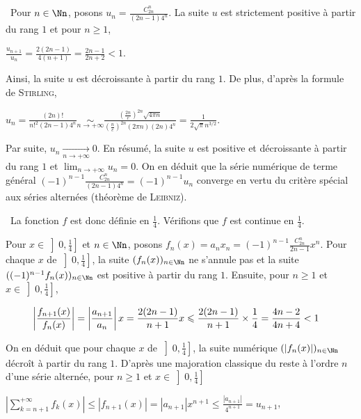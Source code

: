 {{\textbullet~Pour $n\in\Nn$, posons $u_n= \frac{C_{2n}^n}{(2n-1)4^n}$. La suite $u$ est strictement positive à partir du rang $1$ et pour $n\geqslant1$, 

\begin{center}
$ \frac{u_{n+1}}{u_n}= \frac{2(2n-1)}{4(n+1)}= \frac{2n-1}{2n+2}<1$.
\end{center}

Ainsi, la suite $u$ est décroissante à partir du rang $1$. De plus, d'après la formule de \textsc{Stirling},

\begin{center}
$u_n= \frac{(2n)!}{n!^2(2n-1)4^n}\underset{n\rightarrow+\infty}{\sim} \frac{\left( \frac{2n}{e}\right)^{2n}\sqrt{4\pi n}}{\left( \frac{n}{e}\right)^{2n}(2\pi n)(2n)4^n}= \frac{1}{2\sqrt{\pi}n^{3/2}}$.
\end{center}

Par suite, $u_n\underset{n\rightarrow+\infty}{\rightarrow}0$. En résumé, la suite $u$ est positive et décroissante à partir du rang $1$ et $\lim_{n \rightarrow +\infty}u_n=0$. On en déduit que la série numérique de terme général $(-1)^{n-1} \frac{C_{2n}^n}{(2n-1)4^n}=(-1)^{n-1}u_n$ converge en vertu du critère spécial aux séries alternées (théorème de \textsc{Leibniz}).

\textbullet~La fonction $f$ est donc définie en $ \frac{1}{4}$. Vérifions que $f$ est continue en $ \frac{1}{4}$.

Pour  $x\in\left]0, \frac{1}{4}\right]$ et $n\in\Nn$, posons $f_n(x)=a_nx_n=(-1)^{n-1} \frac{C_{2n}^n}{2n-1}x^n$. Pour chaque $x$ de $\left]0, \frac{1}{4}\right]$, la suite $(f_n(x))_{n\in\Nn}$ ne s'annule pas et la suite $((-1)^{n-1}f_n(x))_{n\in\Nn}$ est positive à partir du rang $1$. Ensuite, pour $n\geqslant1$ et $x\in\left]0, \frac{1}{4}\right]$,

\begin{align*}\ensuremath
\left| \frac{f_{n+1}(x)}{f_n(x)}\right|&=\left| \frac{a_{n+1}}{a_n}\right|x= \frac{2(2n-1)}{n+1}x\leqslant \frac{2(2n-1)}{n+1}\times \frac{1}{4}= \frac{4n-2}{4n+4}<1
\end{align*}

On en déduit que pour chaque $x$ de $\left]0, \frac{1}{4}\right]$, la suite numérique $(|f_n(x)|)_{n\in\Nn}$ décroît à partir du rang $1$. D'après une majoration classique du reste à l'ordre $n$ d'une série alternée, pour $n\geqslant1$ et $x\in\left]0, \frac{1}{4}\right]$

\begin{center}
$\left|\sum_{k=n+1}^{+\infty}f_k(x)\right|\leqslant|f_{n+1}(x)|=|a_{n+1}|x^{n+1}\leqslant \frac{|a_{n+1}|}{4^{n+1}}=u_{n+1}$,
\end{center}

}}
